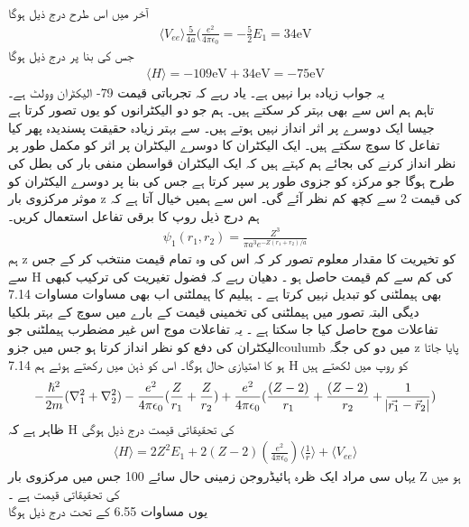  آخر میں اس طرح درج ذیل ہوگا 
\begin{align}
\langle V_{ee} \rangle\frac{5}{4a}(\frac{e^{2}}{4\pi\epsilon_{0}}=-\frac{5}{2}E_{1}=34\text{eV} 
\end{align}
 جس کی بنا پر درج ذیل ہوگا 
\begin{align}
\langle H \rangle =-109 \text{eV}+34 \text{eV}=-75\text{eV} 
\end{align}
 یہ جواب زیادہ برا نہیں ہے۔
یاد رہے کہ تجرباتی قیمت 79- الیکٹران وولٹ ہے۔\\
تاہم ہم اس سے بھی بہتر کر سکتے ہیں۔
ہم  جو دو الیکٹرانوں کو یوں تصور کرتا ہے جیسا ایک دوسرے پر اثر انداز نہیں ہوتے ہیں۔
سے بہتر زیادہ حقیقت پسندیدہ  پھر کیا تفاعل کا سوچ سکتے ہیں۔
ایک الیکٹران کا دوسرے الیکٹران پر اثر کو مکمل طور پر نظر انداز کرنے کی بجائے ہم کہتے ہیں کہ ایک الیکٹران قواسطن منفی بار کی بطل کی طرح ہوگا جو مرکزہ کو جزوی طور پر سپر کرتا ہے جس کی بنا پر دوسرے الیکٹران کو موثر مرکزوی بار z کی قیمت 2 سے کچھ کم نظر آئے گی۔ اس سے ہمیں خیال آتا ہے کہ ہم درج ذیل روپ کا برقی تفاعل استعمال کریں۔
\begin{align}
\psi_{1}(r_{1},r_{2})=\frac{Z^{3}}{\pi a^{3}e^{-Z(r_{1}+r_{2})/a}} 
\end{align}
 ہم z کو تخیریت کا مقدار معلوم تصور کر کہ اس کی وہ تمام قیمت منتخب کر کے جس سے H کی کم سے کم قیمت حاصل ہو ۔
دھیان رہے کہ فضول تغیریت کی ترکیب کبھی بھی ہیملٹنی کو تبدیل نہیں کرتا ہے ۔
ہیلیم کا ہیملٹنی اب بھی مساوات 
مساوات 7.14
دیگی البتہ
تصور میں ہیملٹنی کی تخمینی قیمت کے بارے میں سوچ کے بہتر بلکیا تفاعلات موج حاصل کیا جا سکتا ہے ۔
یہ تفاعلات موج اس غیر مضطرب ہیملٹنی جو الیکٹران کی دفع کو نظر انداز کرتا ہو جس میں جزوcoulumb میں دو کی جگہ z پایا جاتا ہو کا امتیازی حال ہوگا۔
اس کو ذہن میں رکھتے ہوئے ہم 7.14 H کو روپ میں لکھتے ہیں 
\begin{align}
-\frac{\hslash^{2}}{2m}(\nabla_{1}^{2}+\nabla_{2}^{2})-\frac{e^{2}}{4\pi\epsilon_{0}}(\frac{Z}{r_{1}}+\frac{Z}{r_{2}})+\frac{e^{2}}{4\pi\epsilon_{0}}(\frac{(Z-2)}{r_{1}}+\frac{(Z-2)}{r_{2}}+\frac{1}{\abs{\vec{r_{1}}-\vec{r}_{2}}})
\end{align}
 ظاہر ہے کہ H کی تحقیقاتی قیمت درج ذیل ہوگی 
\begin{align}
\langle H \rangle = 2Z^{2}E_{1}+2(Z-2)(\frac{e^{2}}{4\pi\epsilon_{0}})\langle \frac{1}{r}\rangle + \langle V_{ee} \rangle 
\end{align}
 یہاں  سی مراد ایک ظرہ ہائیڈروجن زمینی حال سائے 100 جس میں مرکزوی بار 
Z
 ہو میں  کی  تحقیقاتی  قیمت ہے ۔\\
یوں مساوات 6.55 کے تحت درج ذیل ہوگا 
